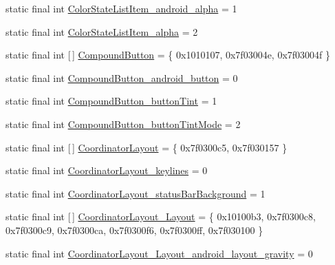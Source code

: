 \begin{DoxyCompactItemize}
\item 
static final int \mbox{\hyperlink{classandroid_1_1support_1_1v7_1_1appcompat_1_1_r_1_1styleable_ad39e8bbfe1d8ff245e2181bd401b21ab}{Color\+State\+List\+Item\+\_\+android\+\_\+alpha}} = 1
\item 
static final int \mbox{\hyperlink{classandroid_1_1support_1_1v7_1_1appcompat_1_1_r_1_1styleable_a4cd9be97c7ba37b33d80e30be11d4814}{Color\+State\+List\+Item\+\_\+alpha}} = 2
\item 
static final int \mbox{[}$\,$\mbox{]} \mbox{\hyperlink{classandroid_1_1support_1_1v7_1_1appcompat_1_1_r_1_1styleable_aa66e991e0d5dc9db5a9048c91817235f}{Compound\+Button}} = \{ 0x1010107, 0x7f03004e, 0x7f03004f \}
\item 
static final int \mbox{\hyperlink{classandroid_1_1support_1_1v7_1_1appcompat_1_1_r_1_1styleable_a63a32142a434a35b617a20d37de7309b}{Compound\+Button\+\_\+android\+\_\+button}} = 0
\item 
static final int \mbox{\hyperlink{classandroid_1_1support_1_1v7_1_1appcompat_1_1_r_1_1styleable_ad218170e42fc2d34a654daa377be5365}{Compound\+Button\+\_\+button\+Tint}} = 1
\item 
static final int \mbox{\hyperlink{classandroid_1_1support_1_1v7_1_1appcompat_1_1_r_1_1styleable_a67ad529a176565bd35892e51d52b2594}{Compound\+Button\+\_\+button\+Tint\+Mode}} = 2
\item 
static final int \mbox{[}$\,$\mbox{]} \mbox{\hyperlink{classandroid_1_1support_1_1v7_1_1appcompat_1_1_r_1_1styleable_a36909bd71e5ee18cc73ff4732b601a79}{Coordinator\+Layout}} = \{ 0x7f0300c5, 0x7f030157 \}
\item 
static final int \mbox{\hyperlink{classandroid_1_1support_1_1v7_1_1appcompat_1_1_r_1_1styleable_adaf9fac57d20eaa13d7dd2eb9d8b5cf7}{Coordinator\+Layout\+\_\+keylines}} = 0
\item 
static final int \mbox{\hyperlink{classandroid_1_1support_1_1v7_1_1appcompat_1_1_r_1_1styleable_a63bc0569222d5d2e3f29673de7f7db86}{Coordinator\+Layout\+\_\+status\+Bar\+Background}} = 1
\item 
static final int \mbox{[}$\,$\mbox{]} \mbox{\hyperlink{classandroid_1_1support_1_1v7_1_1appcompat_1_1_r_1_1styleable_a756aa3eaef70b2d32495c4d817305254}{Coordinator\+Layout\+\_\+\+Layout}} = \{ 0x10100b3, 0x7f0300c8, 0x7f0300c9, 0x7f0300ca, 0x7f0300f6, 0x7f0300ff, 0x7f030100 \}
\item 
static final int \mbox{\hyperlink{classandroid_1_1support_1_1v7_1_1appcompat_1_1_r_1_1styleable_a5c7fc97d6c7e9f316fffd05061a5e954}{Coordinator\+Layout\+\_\+\+Layout\+\_\+android\+\_\+layout\+\_\+gravity}} = 0

\end{DoxyCompactItemize}
